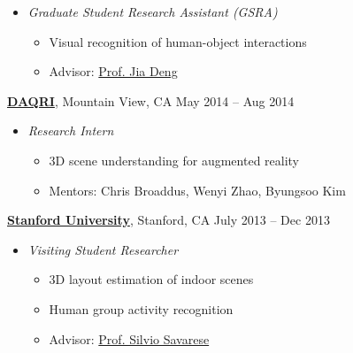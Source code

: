 \documentclass[10pt]{article}
\newenvironment{innerlist}[1][\enskip\textbullet]%
        {\begin{itemize}[#1,leftmargin=*,parsep=0pt,itemsep=0pt,topsep=0pt,partopsep=0pt]}
        {\end{itemize}}
\begin{document}
\begin{innerlist}
\item[] \emph{Graduate Student Research Assistant (GSRA)} \\
    \vspace{-.15in}
    \begin{innerlist}
    \item Visual recognition of human-object interactions
    \item Advisor: \href{http://web.eecs.umich.edu/~jiadeng/}{Prof. Jia Deng}
    \end{innerlist}
\end{innerlist}
\vspace{.1in}
\href{http://daqri.com/}{\textbf{DAQRI}}, Mountain View, CA \hfill {May 2014 -- Aug 2014} \\
\vspace{-.15in}
\begin{innerlist}
\item[] \emph{Research Intern} \\
    \vspace{-.15in}
    \begin{innerlist}
    \item 3D scene understanding for augmented reality
    \item Mentors: Chris Broaddus, Wenyi Zhao, Byungsoo Kim
    \end{innerlist}
\end{innerlist}
\vspace{.1in}
\href{http://www.stanford.edu}{\textbf{Stanford University}}, Stanford, CA \hfill {July 2013 -- Dec 2013} \\
\vspace{-.15in}
\begin{innerlist}
\item[] \emph{Visiting Student Researcher} \\
    \vspace{-.15in}
    \begin{innerlist}
    \item 3D layout estimation of indoor scenes
    \item Human group activity recognition
    \item Advisor: \href{http://cvgl.stanford.edu/silvio/}{Prof. Silvio Savarese}
    \end{innerlist}
\end{innerlist}
\end{document}
